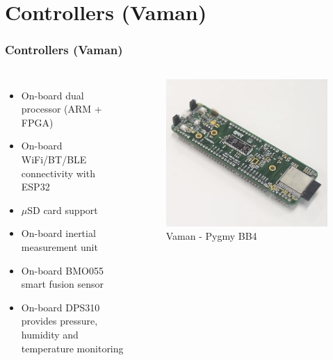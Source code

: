 \documentclass{beamer}
\begin{document}
\section{Controllers (Vaman)}
\begin{frame}
\frametitle{Controllers (Vaman)}
\begin{columns}
	\begin{itemize}
		\item On-board dual processor (ARM + FPGA)
		\item On-board WiFi/BT/BLE connectivity with ESP32
		\item $\mu$SD card support
		\item On-board inertial measurement unit
		\item On-board BMO055 smart fusion sensor
		\item On-board DPS310 provides pressure, humidity and temperature monitoring
	\end{itemize}

	\begin{figure}[h!]
  		\centering
  		\includegraphics[width=0.8\linewidth]{./figs/Vaman.png}
  		\caption{Vaman - Pygmy BB4}
  		\label{Vaman}
	\end{figure}
\end{columns}
\end{frame}
\end{document}
